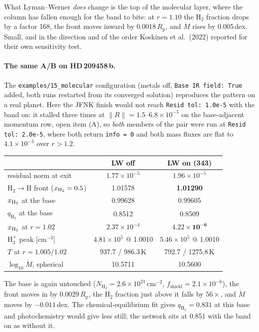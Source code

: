 \documentclass[english,a4paper]{my_memo}
\newcommand{\Rp}{R_{\mathrm{p}}}
\newcommand{\Mdot}{\dot{M}}
\newcommand{\qHH}{q_{\mathrm{H_2}}}
\begin{document}
What Lyman--Werner \emph{does} change is the top of the molecular layer, where the
column has fallen enough for the band to bite: at $r=1.10$ the H$_2$ fraction
drops by a factor 168, the front moves inward by 0.0018\,$\Rp$, and $\Mdot$ rises
by 0.005\,dex. Small, and in the direction and of the order Koskinen et al.\
(2022) reported for their own sensitivity test.

\paragraph{The same A/B on HD\,209458\,b.} The \texttt{examples/15\_molecular}
configuration (metals off, \texttt{Base IR field: True} added, both runs restarted
from its converged solution) reproduces the pattern on a real planet. Here the
JFNK finish would not reach \texttt{Resid tol: 1.0e-5} with the band on: it
stalled three times at $\|R\|=1.5$--$6.8\times10^{-5}$ on the base-adjacent
momentum row, open item (A), so \emph{both} members of
the pair were run at \texttt{Resid tol: 2.0e-5}, where both return
\texttt{info = 0} and both mass fluxes are flat to $4.1\times10^{-3}$ over
$r>1.2$.

\begin{center}\small
\begin{tabular}{@{}lcc@{}}
\toprule
 & LW off & \textbf{LW on (343)} \\
\midrule
residual norm at exit & $1.77\times10^{-5}$ & $1.96\times10^{-5}$ \\
H$_2\to$H front ($x_{\rm H_2}=0.5$) & 1.01578 & \textbf{1.01290} \\
$x_{\rm H_2}$ at the base & 0.99628 & 0.99605 \\
$\qHH$ at the base & 0.8512 & 0.8509 \\
$x_{\rm H_2}$ at $r=1.02$ & $2.37\times10^{-4}$ & $\mathbf{4.22\times10^{-6}}$ \\
H$_3^+$ peak [cm$^{-3}$] & $4.81\times10^{5}$ @ 1.0010 & $5.46\times10^{5}$ @ 1.0010 \\
$T$ at $r=1.005/1.02$ & 937.7 / 986.3\,K & 792.7 / 1275.8\,K \\
$\log_{10}\Mdot$, spherical & 10.5711 & 10.5600 \\
\bottomrule
\end{tabular}
\end{center}

\noindent The base is again untouched ($N_\mathrm{H_2}=2.6\times10^{21}$\,cm$^{-2}$,
$f_\mathrm{shield}=2.1\times10^{-6}$), the front moves in by 0.0029\,$\Rp$, the
H$_2$ fraction just above it falls by $56\times$, and $\Mdot$ moves by
$-0.011$\,dex. The chemical-equilibrium fit gives $\qHH=0.831$ at this base and
photochemistry would give less still; the network sits at 0.851 with the band on
as without it.
\end{document}
